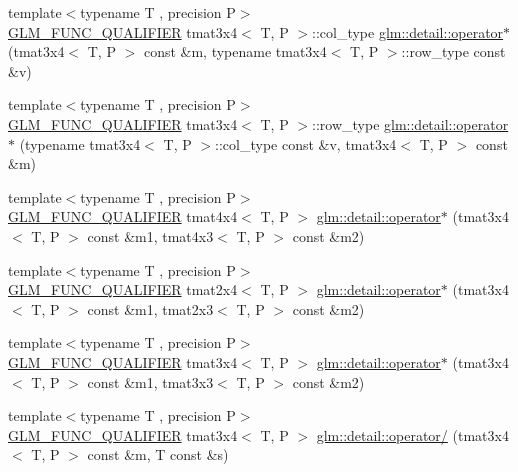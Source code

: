 \begin{DoxyCompactItemize}
\item 
{\footnotesize template$<$typename T , precision P$>$ }\\\hyperlink{setup_8hpp_a33fdea6f91c5f834105f7415e2a64407}{G\+L\+M\+\_\+\+F\+U\+N\+C\+\_\+\+Q\+U\+A\+L\+I\+F\+I\+ER} tmat3x4$<$ T, P $>$\+::col\+\_\+type \hyperlink{namespaceglm_1_1detail_a874a5b43406a205190658e6e8593b673}{glm\+::detail\+::operator$\ast$} (tmat3x4$<$ T, P $>$ const \&m, typename tmat3x4$<$ T, P $>$\+::row\+\_\+type const \&v)
\item 
{\footnotesize template$<$typename T , precision P$>$ }\\\hyperlink{setup_8hpp_a33fdea6f91c5f834105f7415e2a64407}{G\+L\+M\+\_\+\+F\+U\+N\+C\+\_\+\+Q\+U\+A\+L\+I\+F\+I\+ER} tmat3x4$<$ T, P $>$\+::row\+\_\+type \hyperlink{namespaceglm_1_1detail_a34a078a15c647c264062aac975304191}{glm\+::detail\+::operator$\ast$} (typename tmat3x4$<$ T, P $>$\+::col\+\_\+type const \&v, tmat3x4$<$ T, P $>$ const \&m)
\item 
{\footnotesize template$<$typename T , precision P$>$ }\\\hyperlink{setup_8hpp_a33fdea6f91c5f834105f7415e2a64407}{G\+L\+M\+\_\+\+F\+U\+N\+C\+\_\+\+Q\+U\+A\+L\+I\+F\+I\+ER} tmat4x4$<$ T, P $>$ \hyperlink{namespaceglm_1_1detail_a9a8b563dcc339d7b7db875878e68577f}{glm\+::detail\+::operator$\ast$} (tmat3x4$<$ T, P $>$ const \&m1, tmat4x3$<$ T, P $>$ const \&m2)
\item 
{\footnotesize template$<$typename T , precision P$>$ }\\\hyperlink{setup_8hpp_a33fdea6f91c5f834105f7415e2a64407}{G\+L\+M\+\_\+\+F\+U\+N\+C\+\_\+\+Q\+U\+A\+L\+I\+F\+I\+ER} tmat2x4$<$ T, P $>$ \hyperlink{namespaceglm_1_1detail_a691c9e4163cf4f173d5f00723f5e9ee7}{glm\+::detail\+::operator$\ast$} (tmat3x4$<$ T, P $>$ const \&m1, tmat2x3$<$ T, P $>$ const \&m2)
\item 
{\footnotesize template$<$typename T , precision P$>$ }\\\hyperlink{setup_8hpp_a33fdea6f91c5f834105f7415e2a64407}{G\+L\+M\+\_\+\+F\+U\+N\+C\+\_\+\+Q\+U\+A\+L\+I\+F\+I\+ER} tmat3x4$<$ T, P $>$ \hyperlink{namespaceglm_1_1detail_a0e44b262d6e1a7f5500dd5397c16becb}{glm\+::detail\+::operator$\ast$} (tmat3x4$<$ T, P $>$ const \&m1, tmat3x3$<$ T, P $>$ const \&m2)
\item 
{\footnotesize template$<$typename T , precision P$>$ }\\\hyperlink{setup_8hpp_a33fdea6f91c5f834105f7415e2a64407}{G\+L\+M\+\_\+\+F\+U\+N\+C\+\_\+\+Q\+U\+A\+L\+I\+F\+I\+ER} tmat3x4$<$ T, P $>$ \hyperlink{namespaceglm_1_1detail_a2018a6c4910975261ae2fd289e2aa46e}{glm\+::detail\+::operator/} (tmat3x4$<$ T, P $>$ const \&m, T const \&s)

\end{DoxyCompactItemize}
